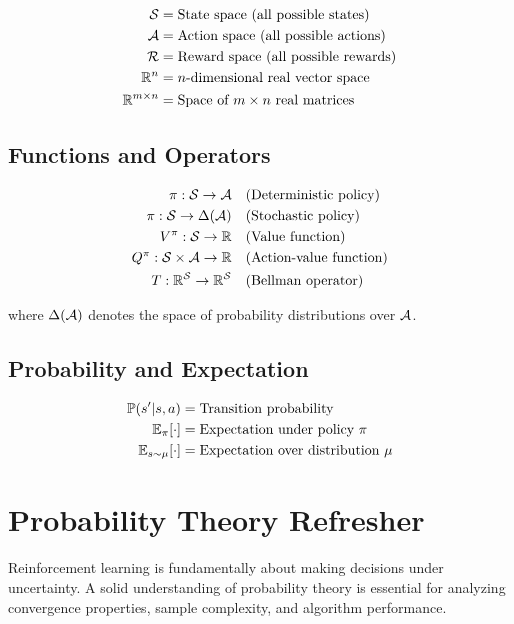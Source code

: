 \begin{align}
\mathcal{S} &= \text{State space (all possible states)} \\
\mathcal{A} &= \text{Action space (all possible actions)} \\
\mathcal{R} &= \text{Reward space (all possible rewards)} \\
\mathbb{R}^n &= \text{$n$-dimensional real vector space} \\
\mathbb{R}^{m \times n} &= \text{Space of $m \times n$ real matrices}
\end{align}

\subsection{Functions and Operators}
\begin{align}
\pi: \mathcal{S} \to \mathcal{A} &\quad \text{(Deterministic policy)} \\
\pi: \mathcal{S} \to \Delta(\mathcal{A}) &\quad \text{(Stochastic policy)} \\
V^\pi: \mathcal{S} \to \mathbb{R} &\quad \text{(Value function)} \\
Q^\pi: \mathcal{S} \times \mathcal{A} \to \mathbb{R} &\quad \text{(Action-value function)} \\
T: \mathbb{R}^{\mathcal{S}} \to \mathbb{R}^{\mathcal{S}} &\quad \text{(Bellman operator)}
\end{align}

where $\Delta(\mathcal{A})$ denotes the space of probability distributions over $\mathcal{A}$.

\subsection{Probability and Expectation}
\begin{align}
\mathbb{P}(s'|s,a) &= \text{Transition probability} \\
\mathbb{E}_\pi[\cdot] &= \text{Expectation under policy $\pi$} \\
\mathbb{E}_{s \sim \mu}[\cdot] &= \text{Expectation over distribution $\mu$}
\end{align}

\section{Probability Theory Refresher}

Reinforcement learning is fundamentally about making decisions under uncertainty. A solid understanding of probability theory is essential for analyzing convergence properties, sample complexity, and algorithm performance.

